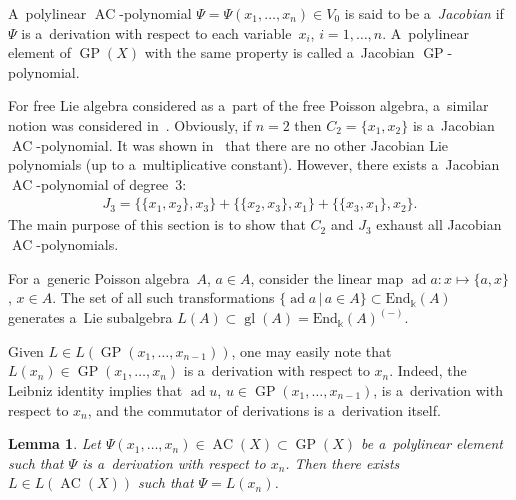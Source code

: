 \documentclass[11pt]{article}
\newtheorem{lemma}{Lemma}
\DeclareMathOperator{\ad}{ad}
\begin{document}
\begin{definition}
A~polylinear $\operatorname{AC}$-polynomial $\Psi=\Psi(x_1,\dots, x_n)\in V_0$ is said to be a~{\em Jacobian} if~$\Psi $ is a~derivation
with respect to each variable~$x_i$, $i=1,\dots, n$.
A~polylinear element of $\operatorname{GP}(X)$ with the same property is called a~Jacobian $\operatorname{GP}$-polynomial.
\end{definition}

For free Lie algebra considered as a~part of the free Poisson algebra, a~similar notion was considered
in~\cite{FarkasI}.
Obviously, if $n=2$ then $C_2=\{x_1,x_2\}$ is a~Jacobian $\operatorname{AC}$-polynomial.
It was shown in~\cite{FarkasI} that there are no other Jacobian Lie polynomials (up to a~multiplicative constant).
However, there exists a~Jacobian $\operatorname{AC}$-polynomial of degree~3:
\begin{gather*}
J_3 =\{\{x_1,x_2\},x_3\} + \{\{x_2,x_3\},x_1\} + \{\{x_3,x_1\},x_2\}.
\end{gather*}
The main purpose of this section is to show that $C_2$ and $J_3$ exhaust all Jacobian $\operatorname{AC}$-polynomials.

For a~generic Poisson algebra~$A$, $a\in A$, consider the linear map $\ad a: x\mapsto \{a,x\}$, $x\in A$.
The set of all such transformations $\{\ad a\,|\, a\in A\}\subset \mathrm{End}_{\Bbbk}(A)$ generates a~Lie
subalgebra $L(A)\subset \operatorname{gl} (A) = \mathrm{End}_{\Bbbk}(A)^{(-)}$.

Given $L\in L(\operatorname{GP}(x_1,\dots, x_{n-1}))$, one may easily note that $L(x_n)\in \operatorname{GP}(x_1,\dots, x_{n})$ is a~derivation with
respect to $x_n$.
Indeed, the Leibniz identity implies that $\ad u$, $u\in \operatorname{GP}(x_1,\dots, x_{n-1})$, is a~derivation with respect
to $x_n$, and the commutator of derivations is a~derivation itself.

\begin{lemma}
\label{lem:1Der_one_var}
Let $\Psi(x_1,\dots, x_n) \in \operatorname{AC}(X)\subset \operatorname{GP}(X)$ be a~polylinear element such that $\Psi $ is a~derivation with respect
to $x_n$.
Then there exists $L\in L(\operatorname{AC}(X))$ such that $\Psi = L(x_n)$.
\end{lemma}
\end{document}
